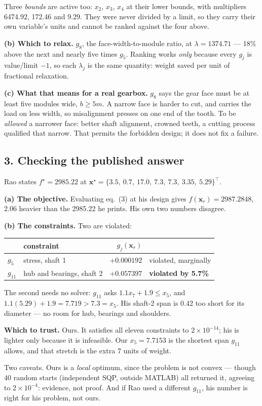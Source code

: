 \documentclass[11pt,a4paper]{article}
\begin{document}
Three \emph{bounds} are active too: $x_2$, $x_3$, $x_4$ at their lower bounds,
with multipliers 6474.92, 172.46 and 9.29. They were never divided by a limit,
so they carry their own variable's units and cannot be ranked against the four
above.

\textbf{(b) Which to relax.} $g_8$, the face-width-to-module ratio, at
$\lambda = 1374.71$ --- 18\% above the next and nearly five times $g_5$. Ranking
works \emph{only} because every $g_j$ is value/limit $-1$, so each $\lambda_j$ is
the same quantity: weight saved per unit of fractional relaxation.

\textbf{(c) What that means for a real gearbox.} $g_8$ says the gear face must be
at least five modules wide, $b \ge 5m$. A narrow face is harder to cut, and
carries the load on less width, so misalignment presses on one end of the tooth.
To be \emph{allowed} a narrower face: better shaft alignment, crowned teeth, a
cutting process qualified that narrow. That permits the forbidden design; it
does not fix a failure.

\subsection*{3. Checking the published answer}

Rao states $f^\star = 2985.22$ at
$\bm{x}^\star = \{3.5,\ 0.7,\ 17.0,\ 7.3,\ 7.3,\ 3.35,\ 5.29\}^\top$.

\textbf{(a) The objective.} Evaluating eq.~(3) at his design gives
$f(\bm{x}_r) = 2987.2848$, 2.06 heavier than the 2985.22 he prints. His own two
numbers disagree.

\textbf{(b) The constraints.} Two are violated:

\begin{center}
\begin{tabular}{llrl}
\toprule
 & constraint & $g_j(\bm{x}_r)$ & \\
\midrule
$g_5$ & stress, shaft 1 & $+0.000192$ & violated, marginally \\
$g_{11}$ & hub and bearings, shaft 2 & $+0.057397$ & \textbf{violated by 5.7\%} \\
\bottomrule
\end{tabular}
\end{center}

The second needs no solver: $g_{11}$ asks $1.1x_7 + 1.9 \le x_5$, and
$1.1(5.29) + 1.9 = 7.719 > 7.3 = x_5$. His shaft-2 span is 0.42 too short for
its diameter --- no room for hub, bearings and shoulders.

\textbf{Which to trust.} Ours. It satisfies all eleven constraints to
$2\times10^{-14}$; his is lighter only because it is infeasible. Our
$x_5 = 7.7153$ is the shortest span $g_{11}$ allows, and that stretch is the
extra 7 units of weight.

Two caveats. Ours is a \emph{local} optimum, since the problem is not convex ---
though 40 random starts (independent SQP, outside MATLAB) all returned it,
agreeing to $2\times10^{-4}$: evidence, not proof. And if Rao used a different
$g_{11}$, his number is right for his problem, not ours.
\end{document}
